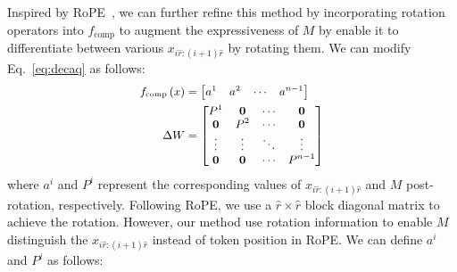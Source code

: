 \documentclass[11pt]{article}
\begin{document}
Inspired by RoPE~\cite{su2024roformer}, we can further refine this method by incorporating rotation operators into $f_{\text{comp}}$ to augment the expressiveness of $M$ by enable it to differentiate between various $x_{i\hat{r}: (i+1)\hat{r}}$ by rotating them.
We can modify Eq.~\ref{eq:decaq} as follows:
\begin{equation}
  \small
  \label{eq:rot}
\begin{split}
f_\text{comp}\left(x\right) &= \begin{bmatrix} a^1 & a^2 & \cdots  & a^{n-1} \end{bmatrix}\\
\Delta W &= \begin{bmatrix}
P^1 & \mathbf{0} & \cdots & \mathbf{0} \\
\mathbf{0} & P^2 & \cdots & \mathbf{0} \\
\vdots & \vdots & \ddots & \vdots \\
\mathbf{0} & \mathbf{0} & \cdots & P^{n-1}
\end{bmatrix}
\end{split}
\end{equation}
where $a^i$ and $P^i$ represent the corresponding values of $x_{i\hat{r}: (i+1)\hat{r}}$ and $M$ post-rotation, respectively.
Following RoPE, we use a $\hat{r}\times\hat{r}$ block diagonal matrix to achieve the rotation.
However, our method use rotation information to enable $M$ distinguish the $x_{i\hat{r}: (i+1)\hat{r}}$ instead of token position in RoPE.
We can define $a^i$ and $P^i$ as follows:
\end{document}
